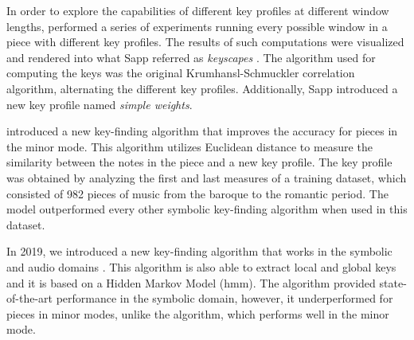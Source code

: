 


In order to explore the capabilities of different key
profiles at different window lengths,
\textcite{sapp2011computational} performed a series of
experiments running every possible window in a piece with
different key profiles. The results of such computations
were visualized and rendered into what Sapp referred as
\emph{keyscapes} \parencite{sapp2001harmonic}. The algorithm
used for computing the keys was the original
Krumhansl-Schmuckler correlation algorithm, alternating the
different key profiles. Additionally, Sapp introduced a new
key profile named \emph{simple weights}.

\textcite{albrecht2013use} introduced a new key-finding
algorithm that improves the accuracy for pieces in the minor
mode. This algorithm utilizes Euclidean distance to measure
the similarity between the notes in the piece and a new key
profile. The key profile was obtained by analyzing the first
and last measures of a training dataset, which consisted of
982 pieces of music from the baroque to the romantic period.
The model outperformed every other symbolic key-finding
algorithm when used in this dataset.




In 2019, we introduced a new key-finding algorithm that
works in the symbolic and audio domains
\parencite{napoleslopez2019keyfinding}. This algorithm is
also able to extract local and global keys and it is based
on a Hidden Markov Model (\gls{hmm}). The algorithm provided
state-of-the-art performance in the symbolic domain,
however, it underperformed for pieces in minor modes, unlike
the \textcite{albrecht2013use} algorithm, which performs
well in the minor mode.

